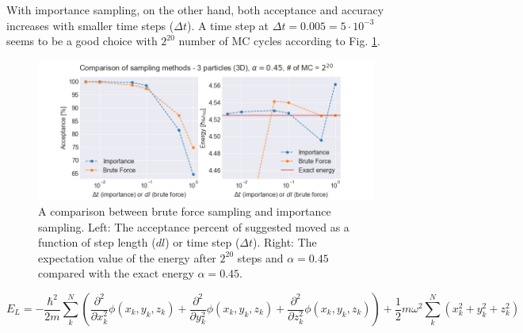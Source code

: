 With importance sampling, on the other hand, both acceptance and accuracy increases with smaller time steps ($\Delta t$). A time step at $\Delta t = 0.005 = 5\cdot10^{-3}$ seems to be a good choice with $2^{20}$ number of MC cycles according to Fig. \ref{fig:compare_importance_steps}. 

\begin{figure}[H]
\center
\includegraphics[width=\linewidth]{../Results/comparison_steps_importance}\caption{A comparison between brute force sampling and importance sampling. Left: The acceptance percent of suggested moved as a function of step length ($dl$) or time step ($\Delta t$). Right: The expectation value of the energy after $2^{20}$ steps and $\alpha = 0.45$ compared with the exact energy $\alpha = 0.45$. }\label{fig:compare_importance_steps}
\end{figure}



 
 \begin{equation}
 E_L = -\frac{\hbar^2}{2m} \sum_k^N \left( \frac{\partial^2}{\partial x_k^2} \phi(x_k,y_k,z_k)  + \frac{\partial^2}{\partial y_k^2} \phi(x_k,y_k,z_k) + \frac{\partial^2}{\partial z_k^2} \phi(x_k,y_k,z_k) \right) + \frac{1}{2}m \omega^2 \sum_k^N \left( x_k^2 + y_k^2 +z_k^2 \right)
 \end{equation}